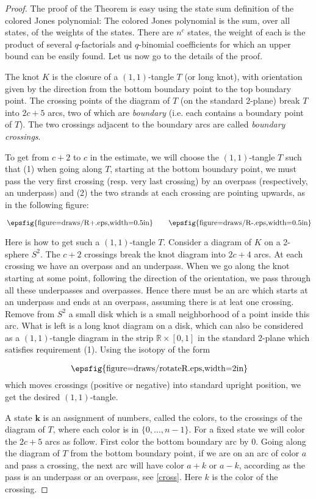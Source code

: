 \documentclass{amsart}
\theoremstyle{definition}
\def\printname#1{
    \if\draft y
        \smash{\makebox[0pt]{\hspace{-0.5in}
            \raisebox{8pt}{\tt\tiny #1}}}
    \fi
}
\newcommand{\psdraw}[2]
         {\begin{array}{c} \hspace{-1.3mm}
    \raisebox{-4pt}{\epsfig{figure=draws/#1.eps,width=#2}}
    \hspace{-1.9mm}\end{array}}
\def\lbl#1{\label{#1}\printname{#1}}
\def\BR{\mathbb R}
\def\bk{\mathbf{k}}
\begin{document}
\begin{proof}
The proof of the Theorem is easy using the state sum
definition of the colored Jones polynomial: The colored Jones
polynomial is the sum, over all states, of the weights of the
states. There are $n^c$ states, the weight of each is the product of
several $q$-factorials and $q$-binomial coefficients for which an
upper bound can be easily found. Let us now go to the details of the proof.

The knot $K$ is the closure of a $(1,1)$-tangle $T$ (or long knot),
with orientation given by the direction from the bottom boundary
point to the top boundary point. The crossing points of the diagram
of $T$ (on the standard 2-plane) break $T$ into $2c+5$ arcs, two of
which are {\em boundary} (i.e. each contains a boundary point of
$T$). The two crossings adjacent to the boundary arcs are called
{\em boundary crossings}.


To get from $c+2$ to $c$ in the estimate, we will choose
 the $(1,1)$-tangle $T$  such that (1) when going along $T$, starting at
 the bottom boundary point, we must pass the very first  crossing
(resp. very last crossing) by an
 overpass (respectively, an underpass) and (2) the two strands
 at each crossing are pointing upwards, as in the following figure:
\begin{equation}
\lbl{cross}
\psdraw{R+}{0.5in} \qquad \psdraw{R-}{0.5in}
\end{equation}


Here is how to get such a $(1,1)$-tangle $T$. Consider a diagram of
$K$ on a 2-sphere $S^2$. The $c+2$ crossings break the knot diagram
into $2c+4$ arcs. At each crossing we have an overpass and an
underpass. When we go along the knot starting at some point,
following the direction of the orientation, we pass through all
these underpasses and overpasses. Hence there must be an arc which
starts at an underpass and ends at an overpass, assuming there is at
leat one crossing. Remove from $S^2$ a small disk which is a small
neighborhood of a point inside this arc. What is left is a long knot
diagram on a disk, which can also be considered as a $(1,1)$-tangle
diagram in the strip $\BR\times [0,1]$ in the standard 2-plane which
satisfies requirement (1). Using the isotopy of the form
$$
\psdraw{rotateR}{2in}
$$
which moves crossings (positive or negative) into standard upright
position, we get the desired $(1,1)$-tangle.

A state $\bk$ is an assignment of numbers, called the colors, to the
crossings of the diagram of $T$, where each color is in
$\{0,\dots,n-1\}$. For a fixed state we will color the $2c+5$ arcs
as follow. First color the bottom boundary arc by 0. Going along the
diagram of $T$ from the bottom boundary point, if we are on an arc
of color $a$ and pass a crossing, the next arc will have color $a+k$
or $a-k$, according as the pass is an underpass or an overpass, see
 \eqref{cross}. Here $k$ is the color of the crossing.



\end{proof}
\end{document}
